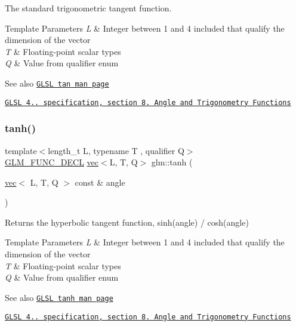The standard trigonometric tangent function.


\begin{DoxyTemplParams}{Template Parameters}
{\em L} & Integer between 1 and 4 included that qualify the dimension of the vector \\
\hline
{\em T} & Floating-\/point scalar types \\
\hline
{\em Q} & Value from qualifier enum\\
\hline
\end{DoxyTemplParams}
\begin{DoxySeeAlso}{See also}
\href{http://www.opengl.org/sdk/docs/manglsl/xhtml/tan.xml}{\tt G\+L\+SL tan man page} 

\href{http://www.opengl.org/registry/doc/GLSLangSpec.4.20.8.pdf}{\tt G\+L\+SL 4.. specification, section 8. Angle and Trigonometry Functions} 
\end{DoxySeeAlso}
\mbox{\label{group__core__func__trigonometric_gaa1bccbfdcbe40ed2ffcddc2aa8bfd0f1}} 
\subsubsection{\texorpdfstring{tanh()}{tanh()}}
{\footnotesize\ttfamily template$<$length\+\_\+t L, typename T , qualifier Q$>$ \\
\mbox{\hyperlink{setup_8hpp_ab2d052de21a70539923e9bcbf6e83a51}{G\+L\+M\+\_\+\+F\+U\+N\+C\+\_\+\+D\+E\+CL}} \mbox{\hyperlink{structglm_1_1vec}{vec}}$<$L, T, Q$>$ glm\+::tanh (\begin{DoxyParamCaption}\item[{\mbox{\hyperlink{structglm_1_1vec}{vec}}$<$ L, T, Q $>$ const \&}]{angle }\end{DoxyParamCaption})}

Returns the hyperbolic tangent function, sinh(angle) / cosh(angle)


\begin{DoxyTemplParams}{Template Parameters}
{\em L} & Integer between 1 and 4 included that qualify the dimension of the vector \\
\hline
{\em T} & Floating-\/point scalar types \\
\hline
{\em Q} & Value from qualifier enum\\
\hline
\end{DoxyTemplParams}
\begin{DoxySeeAlso}{See also}
\href{http://www.opengl.org/sdk/docs/manglsl/xhtml/tanh.xml}{\tt G\+L\+SL tanh man page} 

\href{http://www.opengl.org/registry/doc/GLSLangSpec.4.20.8.pdf}{\tt G\+L\+SL 4.. specification, section 8. Angle and Trigonometry Functions} 
\end{DoxySeeAlso}
